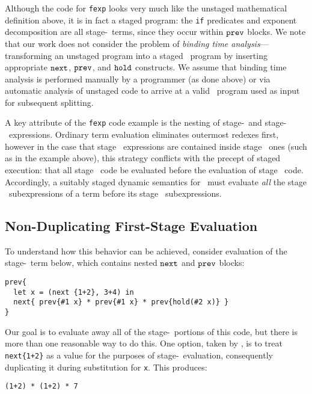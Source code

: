 Although the code for {\tt fexp} looks very much like the unstaged mathematical
definition above, it is in fact a staged program: the {\tt if} predicates and exponent
decomposition are all stage-\bbone\ terms, since they occur within ${\tt prev}$ blocks.
We note that our work does not consider the problem of {\em binding time analysis}---transforming an unstaged program into a staged \lang\ program by inserting appropriate ${\tt next}$, ${\tt prev}$, and ${\tt hold}$ constructs. We assume that binding time analysis is performed manually by a programmer (as done above) or via automatic analysis of unstaged code to arrive at a valid \lang\ program used as input for subsequent splitting.

A key attribute of the {\tt fexp} code example is the nesting of stage-\bbone\ and stage-\bbtwo\ expressions. Ordinary term evaluation eliminates outermost redexes first, 
however in the case that stage \bbone\ expressions are contained inside
stage \bbtwo\ ones (such as in the example above), this strategy conflicts with the precept of staged execution: that all stage \bbone\ code be evaluated before the evaluation of stage \bbtwo\ code. 
Accordingly, a suitably staged dynamic semantics for \lang\ must evaluate
\emph{all} the stage \bbone\ subexpressions of a term before its stage
\bbtwo\ subexpressions.

\subsection{Non-Duplicating First-Stage Evaluation}

To understand how this behavior can be achieved, consider evaluation of the stage-\bbtwo\ term below, which contains nested ${\tt next}$ and ${\tt prev}$ blocks:
\begin{lstlisting} 
prev{
  let x = (next {1+2}, 3+4) in
  next{ prev{#1 x} * prev{#1 x} * prev{hold(#2 x)} }
}
\end{lstlisting}
Our goal is to evaluate away all of the stage-\bbone\ portions of this code, but there is more than one reasonable way to do this.
One option, taken by \cite{davies96}, is to treat \verb|next{1+2}| as a value for the purposes of stage-\bbone~evaluation, 
consequently duplicating it during substitution for {\tt x}.  
This produces:
\begin{lstlisting}
(1+2) * (1+2) * 7
\end{lstlisting}

